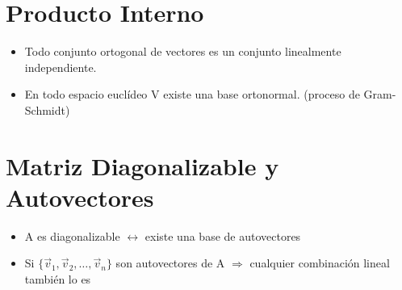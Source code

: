 \documentclass[11pt]{article}
\begin{document}
\section{Producto Interno}
\begin{itemize}
\item Todo conjunto ortogonal de vectores es un conjunto linealmente independiente.
\item  En todo espacio euclídeo V existe una base ortonormal. (proceso de Gram-Schmidt)
\end{itemize}

\section{Matriz Diagonalizable y Autovectores}
\begin{itemize}
\item A es diagonalizable $\leftrightarrow$ existe una base de autovectores 
\item  Si $\{ \vec{v}_1,\vec{v}_2,\hdots, \vec{v}_n\}$ son autovectores de A $\Rightarrow$ cualquier combinación lineal también lo es 
\end{itemize}
\end{document}
